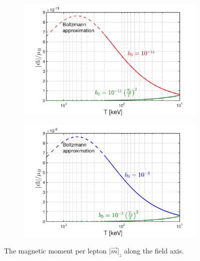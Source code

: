 \documentclass[a4paper]{article}
\begin{document}
\begin{figure}[ht]
    \centering
    \begin{subfigure}[b]{0.49\textwidth}
        \includegraphics[width=\textwidth]{NewMagnetizationDensity001_Boltz.jpg}
    \end{subfigure}
    \hfill
    \begin{subfigure}[b]{0.49\textwidth}
        \includegraphics[width=\textwidth]{NewMagnetizationDensity002_Boltz.jpg}
    \end{subfigure}
    \caption{The magnetic moment per lepton $\vert\vec{m}\vert_{z}$ along the field axis.}
    \label{fig:momentperlepton}
\end{figure}

\end{document}
